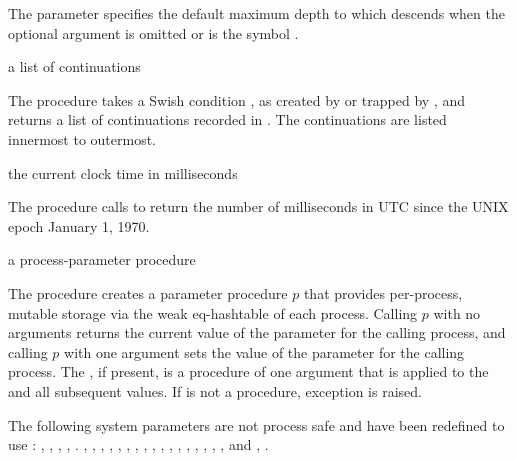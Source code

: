 The  parameter specifies the default maximum
depth to which  descends when the optional 
argument is omitted or is the symbol .

\begin{procedure}
\end{procedure}
\returns{} a list of continuations

The  procedure takes a Swish condition ,
as created by  or trapped by ,
and returns a list of continuations recorded in .
The continuations are listed innermost to outermost.

\begin{procedure}
\end{procedure}
\returns{} the current clock time in milliseconds

The  procedure calls  to return
the number of milliseconds in UTC since the UNIX epoch January 1,
1970.

\begin{procedure}
\end{procedure}
\returns{} a process-parameter procedure

The  procedure creates a parameter
procedure $p$ that provides per-process, mutable storage via the
 weak eq-hashtable of each process. Calling $p$ with
no arguments returns the current value of the parameter for the
calling process, and calling $p$ with one argument sets the value of
the parameter for the calling process. The , if present,
is a procedure of one argument that is applied to the 
and all subsequent values. If  is not a procedure,
exception  is
raised.

The following system parameters are not process safe and have
been redefined to use :
,
,
,
,
.
,
,
,
,
,
,
,
,
,
,
,
,
,
,
,
,
, and
,
.

